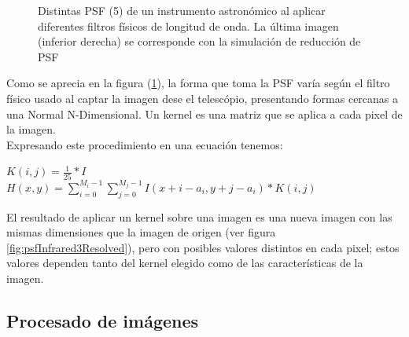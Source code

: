 \begin{enumerate}
\begin{figure}[!htb]
    		\caption{\label{fig:psfInfrared}{\small Distintas PSF (5) de un instrumento astronómico al aplicar diferentes filtros físicos de longitud de onda. La última imagen (inferior derecha) se corresponde con la simulación de reducción de PSF}}
    	\end{figure}
	Como se aprecia en la figura (\ref{fig:psfInfrared}), la forma que toma la PSF varía según el filtro físico usado al captar la imagen dese el telescópio, presentando formas cercanas a una Normal N-Dimensional.
    Un kernel es una matriz que se aplica a cada pixel de la imagen. 
	\\
    Expresando este procedimiento en una ecuación tenemos:
    \begin{center}
	    {\large $ K(i,j) = \frac{1}{25} * I$}\\
	    {\large $ H(x,y) = \sum_{i=0}^{M_{i}-1}\sum_{j=0}^{M_{j}-1}I(x+i-a_{i},y+j-a_{i})*K(i,j) $}
    \end{center}

	El resultado de aplicar un kernel sobre una imagen es una nueva imagen con las mismas dimensiones que la imagen de origen (ver figura \ref{fig:psfInfrared3Resolved}), pero con posibles valores distintos en cada pixel; estos valores dependen tanto del kernel elegido como de las características de la imagen.

	\end{enumerate}
	\subsection{Procesado de imágenes}
